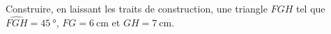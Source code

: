
\begin{exercice}\label{exosmath-0886}

    Construire, en laissant les traits de construction, une triangle \( FGH\) tel que \( \widehat{FGH}=\SI{45}{\degree}\), \( FG=\SI{6}{\centi\meter}\) et \( GH=\SI{7}{\centi\meter}\).

\end{exercice}
